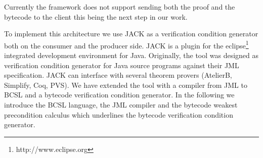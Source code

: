 Currently the framework does not support sending both the proof and the 
bytecode to the client this being the next step in our work. 



To implement this architecture we use JACK as a verification condition generator both on the consumer and the
producer side. JACK is a plugin for the eclipse\footnote{http://www.eclipse.org} integrated development environment for Java. Originally, the tool was designed as verification condition generator for Java source programs against their JML specification. JACK can interface with several theorem provers (AtelierB, Simplify, Coq, PVS). We have extended the tool with a compiler from JML to BCSL and a bytecode verification condition generator. In the following we introduce the BCSL language, the JML compiler and the bytecode weakest precondition calculus which underlines the bytecode verification condition generator.
 
